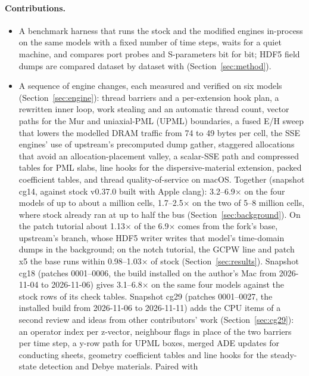 \paragraph{Contributions.}
\begin{itemize}
\item A benchmark harness that runs the stock and the modified engines in-process on the same models with a fixed
  number of time steps, waits for a quiet machine, and compares port probes and S-parameters bit for bit; HDF5 field
  dumps are compared dataset by dataset with  (Section~\ref{sec:method}).
\item A sequence of engine changes, each measured and verified on six models (Section~\ref{sec:engine}): thread
  barriers and a per-extension hook plan, a rewritten inner loop, work stealing and an automatic thread count, vector
  paths for the Mur and uniaxial-PML (UPML) boundaries, a fused E/H sweep that lowers the modelled DRAM traffic from
  74 to 49 bytes per cell, the SSE engines' use of upstream's precomputed dump gather, staggered allocations that
  avoid an allocation-placement valley, a scalar-SSE path and compressed tables for PML slabs, line hooks for the
  dispersive-material extension, packed coefficient tables, and thread quality-of-service on macOS. Together
  (snapshot cg14, against stock v0.37.0 built with Apple clang): 3.2--6.9$\times$ on the four models of up to about a
  million cells, 1.7--2.5$\times$ on the two of 5--8 million cells, where stock already ran at up to half the bus
  (Section~\ref{sec:background}). On the patch tutorial about 1.13$\times$ of the 6.9$\times$ comes from the fork's
  base, upstream's  branch, whose HDF5 writer writes that model's time-domain dumps in the
  background; on the notch tutorial, the GCPW line and patch x5 the base runs within 0.98--1.03$\times$ of stock
  (Section~\ref{sec:results}). Snapshot cg18 (patches 0001--0006, the build installed on the author's Mac from
  2026-11-04 to 2026-11-06) gives 3.1--6.8$\times$ on the same four models against the stock rows of its check
  tables. Snapshot cg29 (patches 0001--0027, the installed build from 2026-11-06 to 2026-11-11) adds the CPU items
  of a second
  review and ideas from other contributors' work (Section~\ref{sec:cg29}): an operator index per z-vector, neighbour
  flags in place of the two barriers per time step, a y-row path for UPML boxes, merged ADE updates for conducting
  sheets, geometry coefficient tables and line hooks for the steady-state detection and Debye materials. Paired with

\end{itemize}
